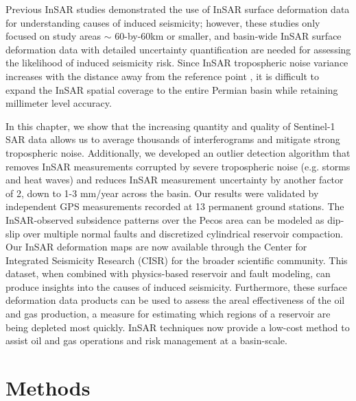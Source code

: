\documentclass{utexasthesis}
\begin{document}
Previous InSAR studies demonstrated the use of InSAR surface deformation data for understanding causes of induced seismicity; however, these studies only focused on study areas $ \sim $ 60-by-60km or smaller, and basin-wide InSAR surface deformation data with detailed uncertainty quantification are needed for assessing the likelihood of induced seismicity risk. Since InSAR tropospheric noise variance increases with the distance away from the reference point \citep{Emardson2003NeutralAtmosphericDelay}, it is difficult to expand the InSAR spatial coverage to the entire Permian basin while retaining millimeter level accuracy. 

In this chapter, we show that the increasing quantity and quality of Sentinel-1 SAR data allows us to average thousands of interferograms and mitigate strong tropospheric noise. Additionally, we developed an outlier detection algorithm that removes InSAR measurements corrupted by severe tropospheric noise (e.g. storms and heat waves) and reduces InSAR measurement uncertainty by another factor of 2, down to 1-3 mm/year across the basin. Our results were validated by independent GPS measurements recorded at 13 permanent ground stations. The InSAR-observed subsidence patterns over the Pecos area can be modeled as dip-slip over multiple normal faults and discretized cylindrical reservoir compaction. Our InSAR deformation maps are now available through the Center for Integrated Seismicity Research (CISR) for the broader scientific community. This dataset, when combined with physics-based reservoir and fault modeling, can produce insights into the causes of induced seismicity. Furthermore, these surface deformation data products can be used to assess the areal effectiveness of the oil and gas production, a measure for estimating which regions of a reservoir are being depleted most quickly. InSAR techniques now provide a low-cost method to assist oil and gas operations and risk management at a basin-scale.

\section{Methods}
\end{document}
